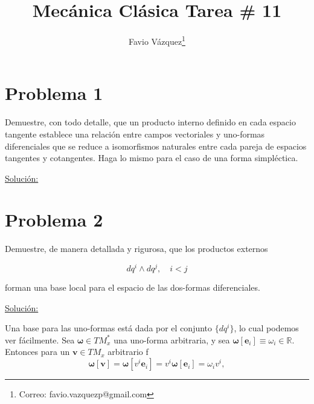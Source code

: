 \documentclass[a4paper,10pt]{article}
\title{Mecánica Clásica Tarea \# 11}
\author{Favio Vázquez\thanks{Correo: favio.vazquezp@gmail.com}}\affil{Instituto de Ciencias Nucleares. Universidad Nacional Autónoma de México.}
\date{}
\numberwithin{equation}{section}
\begin{document}
\makeatletter
\def\@maketitle{%
  \newpage
  \null
  \vskip 2em%
  \begin{center}%
  \let \footnote \thanks
    {\Large\bfseries \@title \par}%
    \vskip 1.5em%
    {\normalsize
      \lineskip .5em%
      \begin{tabular}[t]{c}%
        \@author
      \end{tabular}\par}%
    \vskip 1em%
    {\normalsize \@date}%
  \end{center}%
  \par
  \vskip 1.5em}
\makeatother

\maketitle

\section{Problema 1}

Demuestre, con todo detalle, que un producto interno definido en cada espacio tangente 
establece una relación entre campos vectoriales y uno-formas diferenciales que se reduce 
a isomorfismos naturales entre cada pareja de espacios tangentes y cotangentes. Haga lo 
mismo para el caso de una forma simpléctica. 

\vspace{.3cm}

\underline{Solución:} \vspace{.3cm}

\section{Problema 2}

Demuestre, de manera detallada y rigurosa, que los productos externos 

$$
dq^i \wedge dq^j, \quad i < j
$$

forman una base local para el espacio de las dos-formas diferenciales.

\vspace{.3cm}

\underline{Solución:} \vspace{.3cm}

Una base para las uno-formas está dada por el conjunto $\{dq^i\}$, lo cual podemos 
ver fácilmente. Sea $\mathbf{\omega} \in TM_x^*$ una uno-forma arbitraria, y sea 
$\mathbf{\omega}[\mathbf{e}_i] \equiv \omega_i \in \mathbb{R}$. Entonces para un $\mathbf{v} \in 
TM_x$ arbitrario 
f
\begin{equation}
 \mathbf{\omega}[\mathbf{v}] = \mathbf{\omega}[v^i\mathbf{e}_i] =
 v^i\mathbf{\omega}[\mathbf{e}_i] = \omega_iv^i,
\end{equation}
\end{document}
